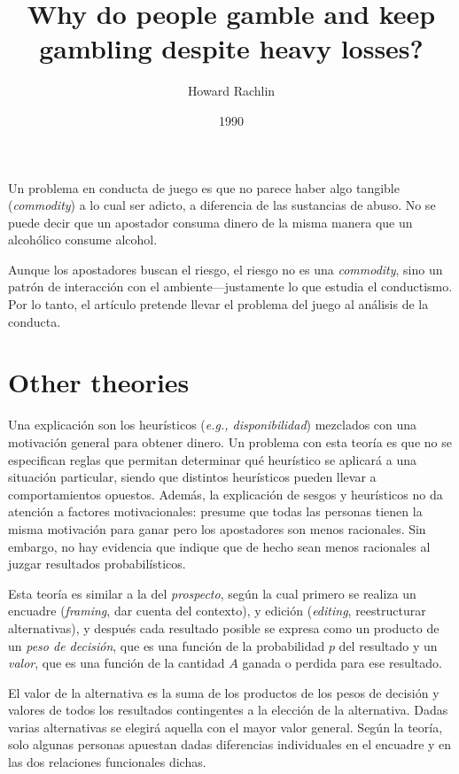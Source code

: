 \documentclass[a4paper,12pt]{article}
\title{Why do people gamble and keep gambling despite heavy losses?}
\author{Howard Rachlin}
\date{1990}
\begin{document}
{\scshape\bfseries \maketitle}

Un problema en conducta de juego es que no parece haber algo tangible ({\itshape commodity}) a lo cual ser adicto, a diferencia de las sustancias de abuso. No se puede decir que un apostador consuma dinero de la misma manera que un alcohólico consume alcohol.

Aunque los apostadores buscan el riesgo, el riesgo no es una {\itshape commodity}, sino un patrón de interacción con el ambiente---justamente lo que estudia el conductismo. Por lo tanto, el artículo pretende llevar el problema del juego al análisis de la conducta.

\section{Other theories}

Una explicación son los heurísticos ({\itshape e.g., disponibilidad}) mezclados con una motivación general para obtener dinero. Un problema con esta teoría es que no se especifican reglas que permitan determinar qué heurístico se aplicará a una situación particular, siendo que distintos heurísticos pueden llevar a comportamientos opuestos. Además, la explicación de sesgos y heurísticos no da atención a factores motivacionales: presume que todas las personas tienen la misma motivación para ganar pero los apostadores son menos racionales. Sin embargo, no hay evidencia que indique que de hecho sean menos racionales al juzgar resultados probabilísticos.

Esta teoría es similar a la del {\itshape prospecto}, según la cual primero se realiza un encuadre ({\itshape framing}, dar cuenta del contexto), y edición ({\itshape editing}, reestructurar alternativas), y después cada resultado posible se expresa como un producto de un {\slshape peso de decisión}, que es una función de la probabilidad $p$ del resultado y un {\slshape valor}, que es una función de la cantidad $A$ ganada o perdida para ese resultado.

El valor de la alternativa es la suma de los productos de los pesos de decisión y valores de todos los resultados contingentes a la elección de la alternativa. Dadas varias alternativas se elegirá aquella con el mayor valor general. Según la teoría, solo algunas personas apuestan dadas diferencias individuales en el encuadre y en las dos relaciones funcionales dichas.
\end{document}
